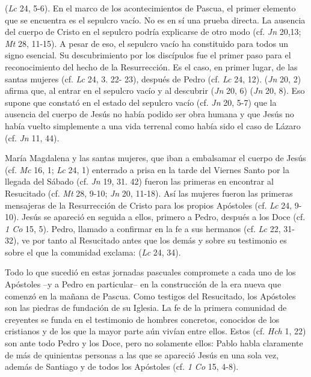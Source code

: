 \begin{ccebody}
  (\textit{Lc} 24, 5-6). En el marco de los acontecimientos de Pascua, el primer elemento que se encuentra es el sepulcro vacío. No es en sí una prueba directa. La ausencia del cuerpo de Cristo en el sepulcro podría explicarse de otro modo (cf. \textit{Jn} 20,13; \textit{Mt} 28, 11-15). A pesar de eso, el sepulcro vacío ha constituido para todos un signo esencial. Su descubrimiento por los discípulos fue el primer paso para el reconocimiento del hecho de la Resurrección. Es el caso, en primer lugar, de las santas mujeres (cf. \textit{Lc} 24, 3. 22- 23), después de Pedro (cf. \textit{Lc} 24, 12).  (\textit{Jn} 20, 2) afirma que, al entrar en el sepulcro vacío y al descubrir  (\textit{Jn} 20, 6)  (\textit{Jn} 20, 8). Eso supone que constató en el estado del sepulcro vacío (cf. \textit{Jn} 20, 5-7) que la ausencia del cuerpo de Jesús no había podido ser obra humana y que Jesús no había vuelto simplemente a una vida terrenal como había sido el caso de Lázaro (cf. \textit{Jn} 11, 44).


 María Magdalena y las santas mujeres, que iban a embalsamar el cuerpo de Jesús (cf. \textit{Mc} 16, 1; \textit{Lc} 24, 1) enterrado a prisa en la tarde del Viernes Santo por la llegada del Sábado (cf. \textit{Jn} 19, 31. 42) fueron las primeras en encontrar al Resucitado (cf. \textit{Mt} 28, 9-10; \textit{Jn} 20, 11-18). Así las mujeres fueron las primeras mensajeras de la Resurrección de Cristo para los propios Apóstoles (cf. \textit{Lc} 24, 9-10). Jesús se apareció en seguida a ellos, primero a Pedro, después a los Doce (cf. \textit{1 Co} 15, 5). Pedro, llamado a confirmar en la fe a sus hermanos (cf. \textit{Lc} 22, 31-32), ve por tanto al Resucitado antes que los demás y sobre su testimonio es sobre el que la comunidad exclama:  (\textit{Lc} 24, 34).

 Todo lo que sucedió en estas jornadas pascuales compromete a cada uno de los Apóstoles –y a Pedro en particular– en la construcción de la era nueva que comenzó en la mañana de Pascua. Como testigos del Resucitado, los Apóstoles son las piedras de fundación de su Iglesia. La fe de la primera comunidad de creyentes se funda en el testimonio de hombres concretos, conocidos de los cristianos y de los que la mayor parte aún vivían entre ellos. Estos  (cf. \textit{Hch} 1, 22) son ante todo Pedro y los Doce, pero no solamente ellos: Pablo habla claramente de más de quinientas personas a las que se apareció Jesús en una sola vez, además de Santiago y de todos los Apóstoles (cf. \textit{1 Co} 15, 4-8).


\end{ccebody}
